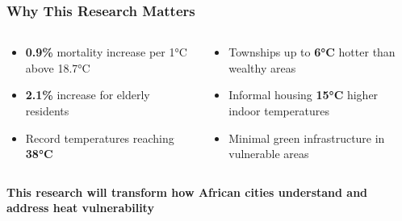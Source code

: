 \documentclass[aspectratio=169]{beamer}
\newcommand{\statistic}[1]{\textcolor{witsaccent}{\textbf{#1}}}
\begin{document}
\begin{frame}
    \frametitle{Why This Research Matters}
    
    \begin{center}
    \end{center}
    
    \vspace{0.5cm}
    \begin{columns}[T]
        \begin{column}{0.48\textwidth}
            \begin{infobox}
                \begin{itemize}[leftmargin=*, itemsep=6pt]
                    \item \statistic{0.9\%} mortality increase per 1°C above 18.7°C
                    \item \statistic{2.1\%} increase for elderly residents
                    \item Record temperatures reaching \statistic{38°C}
                \end{itemize}
            \end{infobox}
        \end{column}
        \begin{column}{0.48\textwidth}
            \begin{infobox}
                \begin{itemize}[leftmargin=*, itemsep=6pt]
                    \item Townships up to \statistic{6°C} hotter than wealthy areas
                    \item Informal housing \statistic{15°C} higher indoor temperatures
                    \item Minimal green infrastructure in vulnerable areas
                \end{itemize}
            \end{infobox}
        \end{column}
    \end{columns}
    
    \vspace{0.5cm}
    \begin{keypoint}
        \centering
        \textbf{This research will transform how African cities understand and address heat vulnerability}
    \end{keypoint}
\end{frame}
\end{document}
